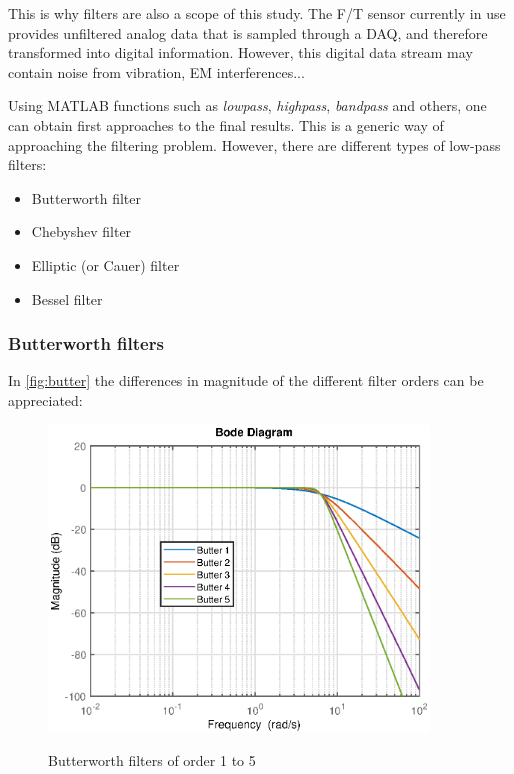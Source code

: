 \documentclass[a4paper]{article}
\begin{document}
{This is why filters are also a scope of this study. The F/T sensor currently in use provides unfiltered analog data that is sampled through a DAQ, and therefore transformed into digital information. However, this digital data stream may contain noise from vibration, EM interferences...

Using MATLAB functions such as \textit{lowpass}, \textit{highpass}, \textit{bandpass} and others, one can obtain first approaches to the final results. 
This is a generic way of approaching the filtering problem. However, there are different types of low-pass filters:

\begin{itemize}
	\item Butterworth filter
	\item Chebyshev filter
	\item Elliptic (or Cauer) filter
	\item Bessel filter
\end{itemize}

\subsubsection{Butterworth filters}

In \autoref{fig:butter} the differences in magnitude of the different filter orders can be appreciated:

\begin{figure}[h!]
	\centering
	\includegraphics[width=0.9\textwidth]{Images/butter_filters.eps}
	\label{fig:butter}
	\caption{Butterworth filters of order 1 to 5}
\end{figure}

}
\end{document}
